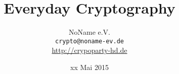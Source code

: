 \documentclass[mathserif]{beamer}
\title{Everyday Cryptography}
\author[NoName e.V.]{NoName e.V. \\ \small{\texttt{crypto@noname-ev.de} } \\ \small{\url{http://crypoparty-hd.de}} }
\institute{NoName e.V.}
\date[xx.05.15]{xx Mai 2015}
\begin{document}
\titlepage
\rmfamily %
\tocframe




\blackframe
\end{document}

